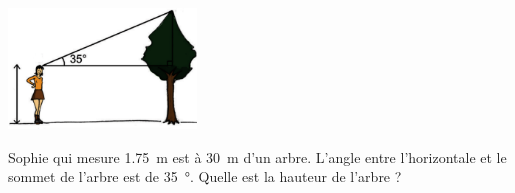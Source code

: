 
\begin{exercice}\label{exo2smath-0247}

    \begin{multicols}{2}

    \begin{center}
\includegraphics[width=5cm]{arbrecosinus2.pdf}
    \end{center}

    \columnbreak

    Sophie qui mesure \SI{1.75}{\meter} est à \SI{30}{\meter} d'un arbre. L'angle entre l'horizontale et le sommet de l'arbre est de \SI{35}{\degree}. Quelle est la hauteur de l'arbre ?

    \end{multicols}
\end{exercice}
